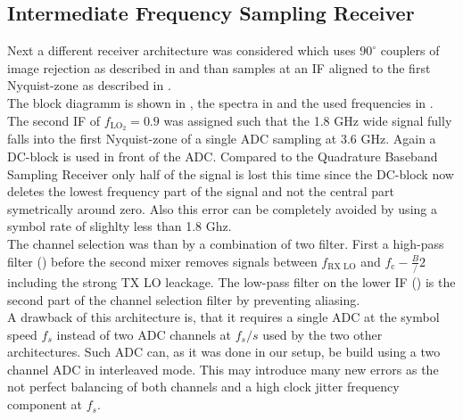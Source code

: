 \subsection{Intermediate Frequency Sampling Receiver}
\label{sec:rx_1}
Next a different receiver architecture was considered which uses
$90^\circ$ couplers of image rejection as described in 
and than samples at an \gls{IF} aligned to the first Nyquist-zone as described
in . \\

The block diagramm is shown in , the spectra in
 and the used frequencies in . \\

The second \gls{IF} of $f_{\text{LO}_2} = 0.9$ was assigned such that
the 1.8 GHz wide signal fully falls into the first Nyquist-zone of
a single \gls{ADC} sampling at 3.6 GHz. Again a \gls{DC}-block
is used in front of the \gls{ADC}. Compared to the Quadrature Baseband
Sampling Receiver only half of the signal is lost this time since
the \gls{DC}-block now deletes the lowest frequency part of the signal
and not the central part symetrically around zero. Also this error
can be completely avoided by using a symbol rate of slighlty less
than 1.8 Ghz. \\

The channel selection was than by a combination of two filter. First
a  high-pass filter () before
the second mixer removes signals between $f_{\text{RX LO}}$ and
$f_{\text{c}} - \frac{B}/{2}$ including the strong \gls{TX} \gls{LO}
leackage. The low-pass filter on the lower \gls{IF}
() is the second part of the channel
selection filter by preventing aliasing. \\

A drawback of this architecture is, that it requires a single \gls{ADC}
at the symbol speed $f_{s}$ instead of two \gls{ADC} channels at
$f_{s} / s$ used by the two other architectures. Such \gls{ADC} can,
as it was done in our setup, be build using a two channel \gls{ADC}
in interleaved mode. This may introduce many new errors as the not
perfect balancing of both channels and a high clock jitter frequency
component at $f_{s}$. \\

